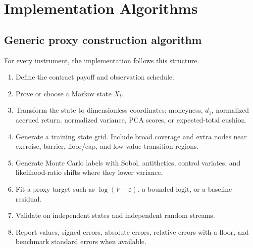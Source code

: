 \documentclass[11pt,oneside]{book}
\theoremstyle{definition}
\begin{document}
\chapter{Implementation Algorithms}

\section{Generic proxy construction algorithm}
For every instrument, the implementation follows this structure.
\begin{enumerate}
  \item Define the contract payoff and observation schedule.
  \item Prove or choose a Markov state \(X_t\).
  \item Transform the state to dimensionless coordinates: moneyness, \(d_1\), normalized accrued return, normalized variance, PCA scores, or expected-total cushion.
  \item Generate a training state grid. Include broad coverage and extra nodes near exercise, barrier, floor/cap, and low-value transition regions.
  \item Generate Monte Carlo labels with Sobol, antithetics, control variates, and likelihood-ratio shifts where they lower variance.
  \item Fit a proxy target such as \(\log(V+\varepsilon)\), a bounded logit, or a baseline residual.
  \item Validate on independent states and independent random streams.
  \item Report values, signed errors, absolute errors, relative errors with a floor, and benchmark standard errors when available.
\end{enumerate}
\end{document}
